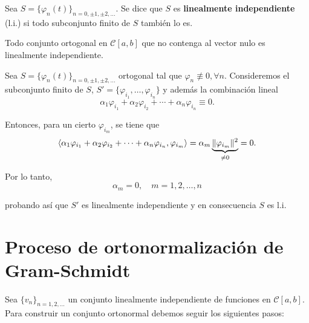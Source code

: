 \begin{defi}
Sea $S = \{\varphi_n(t)\}_{n=0, \pm 1, \pm 2, \dots}$. Se dice que $S$ es \textbf{linealmente independiente} (l.i.) si todo subconjunto finito de $S$ también lo es.
\end{defi}

\begin{propo} \label{LIortogonal}
Todo conjunto ortogonal en $\mathcal{C}[a,b]$ que no contenga al vector nulo es linealmente independiente.
\end{propo}

\begin{demo}
Sea $S = \{\varphi_n(t)\}_{n=0, \pm 1, \pm 2, \dots}$ ortogonal tal que $\varphi_n \not\equiv 0, \forall n$. Consideremos el subconjunto finito de $S$, $S' = \{\varphi_{i_1}, \dots, \varphi_{i_n}\}$ y además la combinación lineal
$$\alpha_1 \varphi_{i_1} + \alpha_2 \varphi_{i_2} + \cdots + \alpha_n \varphi_{i_n} \equiv 0.$$

Entonces, para un cierto $\varphi_{i_m}$, se tiene que
$$\langle \alpha_1 \varphi_{i_1} + \alpha_2 \varphi_{i_2} + \cdots + \alpha_n \varphi_{i_n},\varphi_{i_m} \rangle = \alpha_m \underbrace{\lVert\varphi_{i_m}\rVert^2}_{\neq 0} = 0.$$

Por lo tanto, 
$$\alpha_m = 0, \quad m = 1, 2, \dots, n$$

probando así que $S'$ es linealmente independiente y en consecuencia $S$ es l.i.
\end{demo}

\section{Proceso de ortonormalización de Gram-Schmidt}

Sea $\{v_n\}_{n = 1,2, \dots}$ un conjunto linealmente independiente de funciones en $\mathcal{C}[a,b]$. Para construir un conjunto ortonormal debemos seguir los siguientes pasos:

